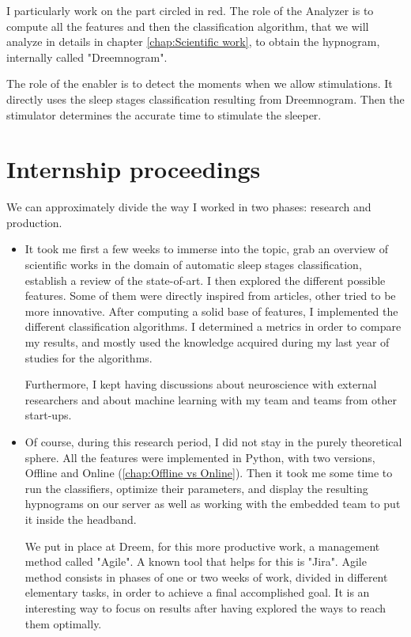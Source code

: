 \documentclass[12pt]{report}
\begin{document}
I particularly work on the part circled in red. The role of the Analyzer is to compute all the features and then the classification algorithm, that we will analyze in details in chapter \ref{chap:Scientific work}, to obtain the hypnogram, internally called "Dreemnogram".

The role of the enabler is to detect the moments when we allow stimulations. It directly uses the sleep stages classification resulting from Dreemnogram. Then the stimulator determines the accurate time to stimulate the sleeper.

\section{Internship proceedings}

We can approximately divide the way I worked in two phases: research and production.

\begin{itemize}
\item It took me first a few weeks to immerse into the topic, grab an overview of scientific works in the domain of automatic sleep stages classification, establish a review of the state-of-art. I then explored the different possible features. Some of them were directly inspired from articles, other tried to be more innovative. After computing a solid base of features, I implemented the different classification algorithms. I determined a metrics in order to compare my results, and mostly used the knowledge acquired during my last year of studies for the algorithms.

Furthermore, I kept having discussions about neuroscience with external researchers and about machine learning with my team and teams from other start-ups.

\item Of course, during this research period, I did not stay in the purely theoretical sphere. All the features were implemented in Python, with two versions, Offline and Online (\ref{chap:Offline vs Online}). Then it took me some time to run the classifiers, optimize their parameters, and display the resulting hypnograms on our server as well as working with the embedded team to put it inside the headband.

We put in place at Dreem, for this more productive work, a management method called "Agile". A known tool that helps for this is "Jira". Agile method consists in phases of one or two weeks of work, divided in different elementary tasks, in order to achieve a final accomplished goal. It is an interesting way to focus on results after having explored the ways to reach them optimally.
\end{itemize}
\end{document}
